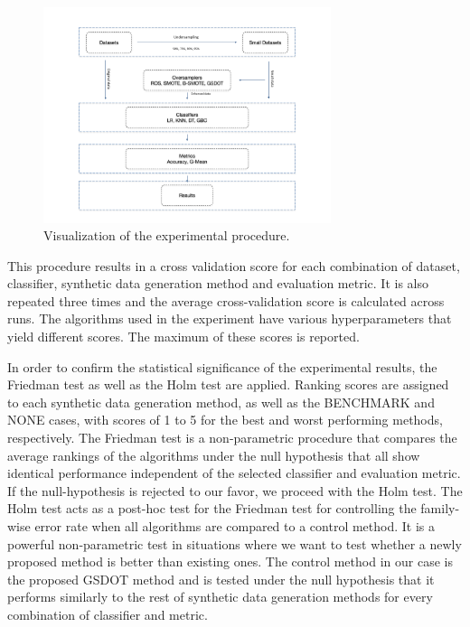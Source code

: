 \begin{figure}
	\centering
	\includegraphics[width=0.75\textwidth]{../analysis/experimental_procedure.png}
	\caption{Visualization of the experimental procedure.}
	\label{fig:experimentalprocedure}
\end{figure}

This procedure results in a cross validation score for each combination of dataset, classifier, synthetic data generation method and evaluation metric. It is also repeated three times and the average cross-validation score is calculated across runs. The algorithms used in the experiment have various hyperparameters that yield different scores. The maximum of these scores is reported.

In order to confirm the statistical significance of the experimental results, the Friedman test as well as the Holm test \cite{JanezDemsar.2006} are applied. Ranking scores are assigned to each synthetic data generation method, as well as the BENCHMARK and NONE cases, with scores of 1 to 5 for the best and worst performing methods, respectively. The Friedman test is a non-parametric procedure that compares the average rankings of the algorithms under the null hypothesis that all show identical performance independent of the selected classifier and evaluation metric. If the null-hypothesis is rejected to our favor, we proceed with the Holm test. The Holm test acts as a post-hoc test for the Friedman test for controlling the family-wise error rate when all algorithms are compared to a control method. It is a powerful non-parametric test in situations where we want to test whether a newly proposed method is better than existing ones. The control method in our case is the proposed GSDOT method and is tested under the null hypothesis that it performs similarly to the rest of synthetic data generation methods for every combination of classifier and metric.

